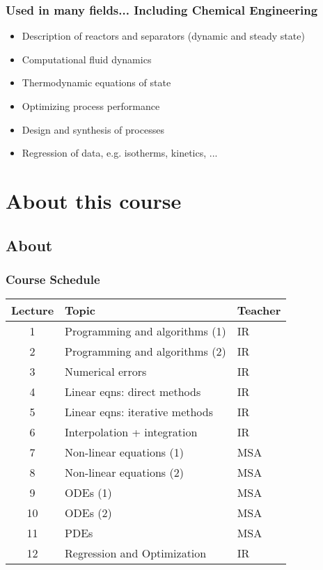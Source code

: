 \begin{frame}
 \frametitle{Used in many fields... Including Chemical Engineering}
  \begin{itemize}
	  \item Description of reactors and separators (dynamic and steady state)
		\item Computational fluid dynamics
		\item Thermodynamic equations of state
		\item Optimizing process performance
		\item Design and synthesis of processes
		\item Regression of data, e.g. isotherms, kinetics, ...
 \end{itemize}
\end{frame}

\section{About this course}
\subsection{About}
\begin{frame}
  \frametitle{Course Schedule}
  \centering
  \begin{tabular}{cll}
  \hline
  Lecture  & Topic & Teacher \\ 
  \hline
  1 & Programming and algorithms (1) & IR \\ 
  2 & Programming and algorithms (2) & IR \\ 
  3 & Numerical errors & IR \\ 
  4 & Linear eqns: direct methods & IR\\ 
  5 & Linear eqns: iterative methods & IR \\ 
  6 & Interpolation + integration & IR \\ 
  7 & Non-linear equations (1) & MSA \\ 
  8 & Non-linear equations (2) & MSA\\ 
  9 & ODEs (1) & MSA \\
  10 & ODEs (2) & MSA \\ 
  11 & PDEs & MSA \\ 
  12 & Regression and Optimization & IR \\ 
  \hline
  \end{tabular} 
 \end{frame}

